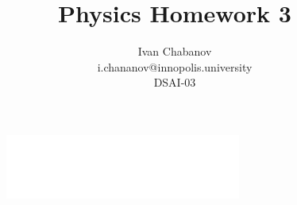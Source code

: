\begin{titlepage}

    \title{Physics Homework 3}
    \author{Ivan Chabanov\\i.chananov@innopolis.university\\DSAI-03}

    \begin{figure}[t]
        \centering
        \includegraphics[width=0.69\textwidth]{innou-logo.png} %
    \end{figure}

    \maketitle

\end{titlepage}
